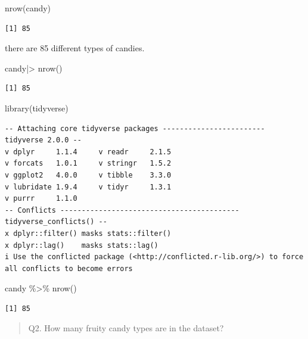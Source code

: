 \documentclass[
  letterpaper,
  DIV=11,
  numbers=noendperiod]{scrartcl}
\newenvironment{Shaded}{\begin{snugshade}}{\end{snugshade}}
\newcommand{\FunctionTok}[1]{\textcolor[rgb]{0.28,0.35,0.67}{#1}}
\newcommand{\NormalTok}[1]{\textcolor[rgb]{0.00,0.23,0.31}{#1}}
\newcommand{\SpecialCharTok}[1]{\textcolor[rgb]{0.37,0.37,0.37}{#1}}
\begin{document}
\begin{Shaded}
\begin{Highlighting}[]
\FunctionTok{nrow}\NormalTok{(candy)}
\end{Highlighting}
\end{Shaded}

\begin{verbatim}
[1] 85
\end{verbatim}

there are 85 different types of candies.

\begin{Shaded}
\begin{Highlighting}[]
\NormalTok{candy}\SpecialCharTok{|\textgreater{}}
  \FunctionTok{nrow}\NormalTok{()}
\end{Highlighting}
\end{Shaded}

\begin{verbatim}
[1] 85
\end{verbatim}

\begin{Shaded}
\begin{Highlighting}[]
 \FunctionTok{library}\NormalTok{(tidyverse)}
\end{Highlighting}
\end{Shaded}

\begin{verbatim}
-- Attaching core tidyverse packages ------------------------ tidyverse 2.0.0 --
v dplyr     1.1.4     v readr     2.1.5
v forcats   1.0.1     v stringr   1.5.2
v ggplot2   4.0.0     v tibble    3.3.0
v lubridate 1.9.4     v tidyr     1.3.1
v purrr     1.1.0     
-- Conflicts ------------------------------------------ tidyverse_conflicts() --
x dplyr::filter() masks stats::filter()
x dplyr::lag()    masks stats::lag()
i Use the conflicted package (<http://conflicted.r-lib.org/>) to force all conflicts to become errors
\end{verbatim}

\begin{Shaded}
\begin{Highlighting}[]
\NormalTok{candy }\SpecialCharTok{\%\textgreater{}\%}
  \FunctionTok{nrow}\NormalTok{()}
\end{Highlighting}
\end{Shaded}

\begin{verbatim}
[1] 85
\end{verbatim}

\begin{quote}
Q2. How many fruity candy types are in the dataset?
\end{quote}
\end{document}
